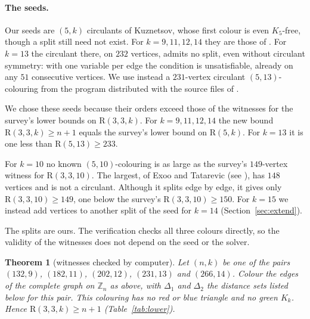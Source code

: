\documentclass[11pt]{article}
\theoremstyle{spacedplain}
\newtheorem{theorem}{Theorem}[section]
\theoremstyle{spaceddef}
\theoremstyle{spacedremark}
\newcommand{\R}{\mathrm{R}}
\begin{document}
\paragraph{The seeds.}
Our seeds are $(5,k)$ circulants of Kuznetsov, whose first colour is even $K_5$-free, though a split still need not exist.
For $k=9,11,12,14$ they are those of \cite[Table~2]{Kuz16}.
For $k=13$ the circulant there, on $232$ vertices, admits no split, even without circulant symmetry: with one variable per edge the condition is unsatisfiable, already on any $51$ consecutive vertices.
We use instead a $231$-vertex circulant $(5,13)$-colouring from the program distributed with the source files of \cite{Kuz16}.

We chose these seeds because their orders exceed those of the witnesses for the survey's lower bounds on $\R(3,3,k)$.
For $k=9,11,12,14$ the new bound $\R(3,3,k)\ge n+1$ equals the survey's lower bound on $\R(5,k)$.
For $k=13$ it is one less than $\R(5,13)\ge 233$.

For $k=10$ no known $(5,10)$-colouring is as large as the survey's $149$-vertex witness for $\R(3,3,10)$.
The largest, of Exoo and Tatarevic \cite{ET15} (see \cite[Table~3]{Kuz16}), has $148$ vertices and is not a circulant.
Although it splits edge by edge, it gives only $\R(3,3,10)\ge 149$, one below the survey's $\R(3,3,10)\ge 150$.
For $k=15$ we instead add vertices to another split of the seed for $k=14$ (Section~\ref{sec:extend}).

The splits are ours.
The verification checks all three colours directly, so the validity of the witnesses does not depend on the seed or the solver.

\begin{theorem}[witnesses checked by computer]\label{thm:lower}
Let $(n,k)$ be one of the pairs $(132,9)$, $(182,11)$, $(202,12)$, $(231,13)$ and $(266,14)$.
Colour the edges of the complete graph on $\mathbb Z_n$ as above, with $\Delta_1$ and $\Delta_2$ the distance sets listed below for this pair.
This colouring has no red or blue triangle and no green $K_k$.
Hence $\R(3,3,k)\ge n+1$ (Table~\ref{tab:lower}).
\end{theorem}
\end{document}
